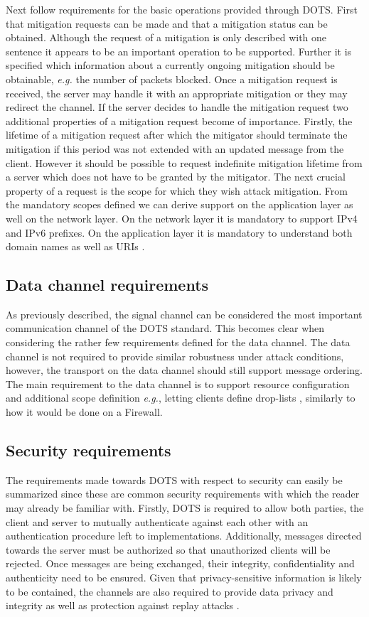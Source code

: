 Next follow requirements for the basic operations provided through DOTS. First that mitigation requests can be made and that a mitigation status can be obtained. Although the request of a mitigation is only described with one sentence it appears to be an important operation to be supported. Further it is specified which information about a currently ongoing mitigation should be obtainable, \emph{e.g.} the number of packets blocked. Once a mitigation request is received, the server may handle it with an appropriate mitigation or they may redirect the channel. If the server decides to handle the mitigation request two additional properties of a mitigation request become of importance. Firstly, the lifetime of a mitigation request after which the mitigator should terminate the mitigation if this period was not extended with an updated message from the client. However it should be possible to request indefinite mitigation lifetime from a server which does not have to be granted by the mitigator. The next crucial property of a request is the scope for which they wish attack mitigation. From the mandatory scopes defined we can derive support on the application layer as well on the network layer. On the network layer it is mandatory to support IPv4 and IPv6 prefixes. On the application layer it is mandatory to understand both domain names as well as URIs \cite{rfc8612}.


\subsection{Data channel requirements}
As previously described, the signal channel can be considered the most important communication channel of the DOTS standard. This becomes clear when considering the rather few requirements defined for the data channel. The data channel is not required to provide similar robustness under attack conditions, however, the transport on the data channel should still support message ordering. The main requirement to the data channel is to support resource configuration and additional scope definition \emph{e.g.}, letting clients define drop-lists \cite{rfc8612}, similarly to how it would be done on a Firewall.

\subsection{Security requirements}
The requirements made towards DOTS with respect to security can easily be summarized since these are common security requirements with which the reader may already be familiar with.
Firstly, DOTS is required to allow both parties, the client and server to mutually authenticate against each other with an authentication procedure left to implementations. Additionally, messages directed towards the server must be authorized so that unauthorized clients will be rejected. Once messages are being exchanged, their integrity, confidentiality and authenticity need to be ensured. Given that privacy-sensitive information is likely to be contained, the channels are also required to provide data privacy and integrity as well as protection against replay attacks \cite{rfc8612}.

